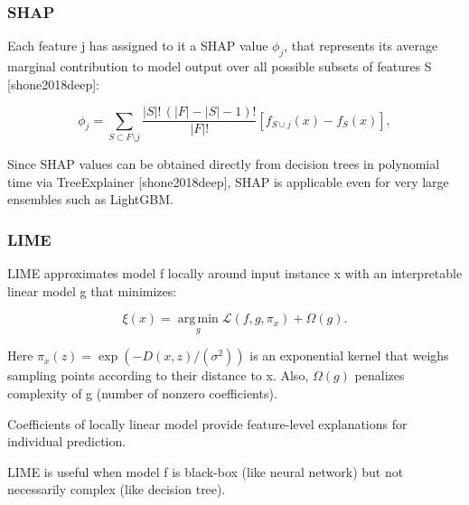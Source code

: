 \subsubsection {SHAP}

Each feature j has assigned to it a SHAP value $\phi_j$, that represents its average marginal contribution to model output over all possible subsets of features S [shone2018deep]:

$$ \phi_j = \sum_{S \subset F \setminus j}\frac{|S|!\,(|F|-|S|-1)!}{|F|!}\left[f_{S \cup j}(x)-f_S(x)\right], $$

Since SHAP values can be obtained directly from decision trees in polynomial time via TreeExplainer [shone2018deep], SHAP is applicable even for very large ensembles such as LightGBM.

\subsubsection {LIME}

LIME approximates model f locally around input instance x with an interpretable linear model g that minimizes:

$$ \xi(x)=\operatorname*{arg\,min}_g {\mathcal L(f,g,\pi_x)} + \Omega(g). $$

Here $\pi_x(z)=\exp(-D(x,z)/(\sigma^2))$ is an exponential kernel that weighs sampling points according to their distance to x. Also, $\Omega(g)$ penalizes complexity of g (number of nonzero coefficients).

Coefficients of locally linear model provide feature-level explanations for individual prediction.

LIME is useful when model f is black-box (like neural network) but not necessarily complex (like decision tree).